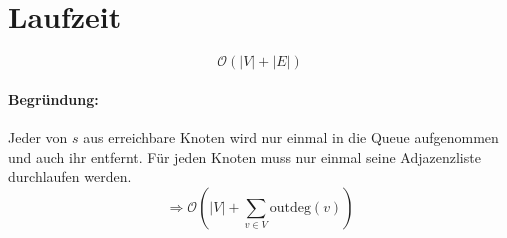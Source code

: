 \section{Laufzeit} %
\[ \mathcal{O}(|V|+|E|) \]
\paragraph{Begründung:}
Jeder von $s$ aus erreichbare Knoten wird nur einmal in die Queue aufgenommen und auch ihr entfernt. Für jeden Knoten muss nur einmal seine Adjazenzliste durchlaufen werden.
\[  \Rightarrow \mathcal{O}\left(|V|+\sum_{v \in V}\text{outdeg}(v) \right) \]

\clearpage